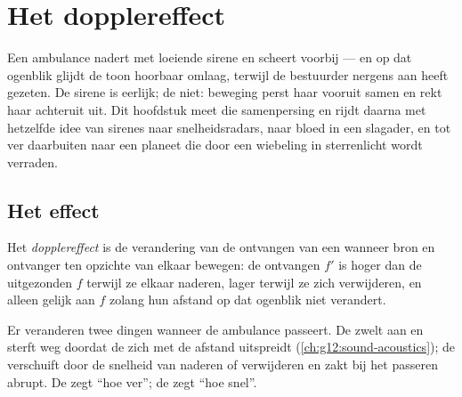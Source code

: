 \chapter{Het dopplereffect}\label{ch:g12:doppler-effect}

Een ambulance nadert met loeiende sirene en scheert voorbij --- en op dat
ogenblik glijdt de toon hoorbaar omlaag, terwijl de bestuurder nergens
aan heeft gezeten. De sirene is eerlijk; de  niet: beweging perst haar
vooruit samen en rekt haar achteruit uit. Dit hoofdstuk meet die
samenpersing en rijdt daarna met hetzelfde idee van sirenes naar
snelheidsradars, naar bloed in een slagader, en tot ver daarbuiten naar
een planeet die door een wiebeling in sterrenlicht wordt verraden.

\section{Het effect}

\begin{definition}[Dopplereffect]\label{def:g12:doppler-effect:doppler}
Het \emph{dopplereffect} is de verandering van de
ontvangen  van een  wanneer bron en ontvanger ten opzichte
van elkaar bewegen: de ontvangen  $f'$ is hoger dan de
uitgezonden  $f$ terwijl ze elkaar naderen, lager terwijl ze
zich verwijderen, en alleen gelijk aan $f$ zolang hun afstand op dat
ogenblik niet verandert.
\end{definition}

\begin{remark}\label{rem:g12:doppler-effect:pitch}
Er veranderen twee dingen wanneer de ambulance passeert. De
\emph{} zwelt aan en sterft weg doordat de  zich met de
afstand uitspreidt (\cref{ch:g12:sound-acoustics}); de \emph{}
verschuift door de snelheid van naderen of verwijderen en zakt bij het
passeren abrupt. De  zegt ``hoe ver''; de  zegt ``hoe
snel''.
\end{remark}

